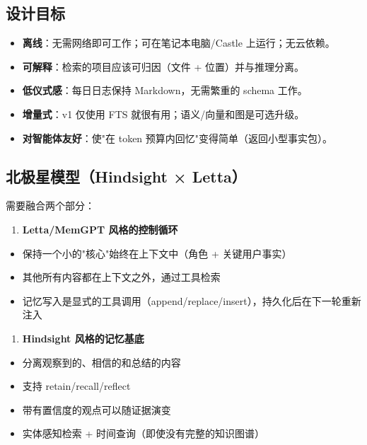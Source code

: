 \subsection{设计目标}


\begin{itemize}
  \item \textbf{离线}：无需网络即可工作；可在笔记本电脑/Castle 上运行；无云依赖。
  \item \textbf{可解释}：检索的项目应该可归因（文件 + 位置）并与推理分离。
  \item \textbf{低仪式感}：每日日志保持 Markdown，无需繁重的 schema 工作。
  \item \textbf{增量式}：v1 仅使用 FTS 就很有用；语义/向量和图是可选升级。
  \item \textbf{对智能体友好}：使"在 token 预算内回忆"变得简单（返回小型事实包）。
\end{itemize}


\subsection{北极星模型（Hindsight × Letta）}


需要融合两个部分：

\begin{enumerate}
  \item \textbf{Letta/MemGPT 风格的控制循环}
\end{enumerate}


\begin{itemize}
  \item 保持一个小的"核心"始终在上下文中（角色 + 关键用户事实）
  \item 其他所有内容都在上下文之外，通过工具检索
  \item 记忆写入是显式的工具调用（append/replace/insert），持久化后在下一轮重新注入
\end{itemize}


\begin{enumerate}
  \item \textbf{Hindsight 风格的记忆基底}
\end{enumerate}


\begin{itemize}
  \item 分离观察到的、相信的和总结的内容
  \item 支持 retain/recall/reflect
  \item 带有置信度的观点可以随证据演变
  \item 实体感知检索 + 时间查询（即使没有完整的知识图谱）
\end{itemize}


